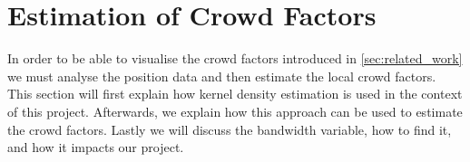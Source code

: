 \section{Estimation of Crowd Factors}
\label{sec:kernelTheory}
In order to be able to visualise the crowd factors introduced in \cref{sec:related_work} we must analyse the position data and then estimate the local crowd factors. This section will first explain how kernel density estimation is used in the context of this project. Afterwards, we explain how this approach can be used to estimate the crowd factors. Lastly we will discuss the bandwidth variable, how to find it, and how it impacts our project.




